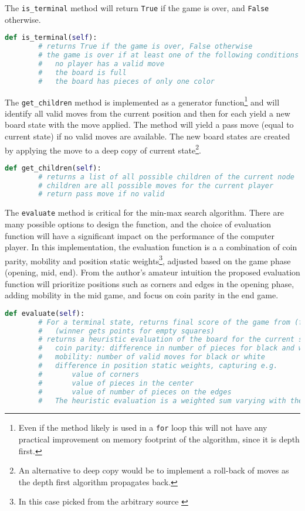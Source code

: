 \documentclass[a4paper]{article}
\begin{document}
The \texttt{is\_terminal} method will return \texttt{True} if the game is over, and \texttt{False} otherwise. 

\begin{lstlisting}[language=Python]
    def is_terminal(self):
        # returns True if the game is over, False otherwise
        # the game is over if at least one of the following conditions holds true:
        #   no player has a valid move
        #   the board is full
        #   the board has pieces of only one color
\end{lstlisting}

The \texttt{get\_children} method is implemented as a generator function\footnote{Even if the method  likely is used in a \texttt{for} loop this will not have any practical improvement on memory footprint of the algorithm, since it is depth first.} and will identify all valid moves from the current position and then for each yield a new board state with the move applied. The method will yield a pass move (equal to current state) if no valid moves are available. The new board states are created by applying the move to a deep copy of current state\footnote{An alternative to deep copy would be to implement a roll-back of moves as the depth first algorithm propagates back.}.

\begin{lstlisting}[language=Python]
    def get_children(self):
        # returns a list of all possible children of the current node
        # children are all possible moves for the current player
        # return pass move if no valid
\end{lstlisting}

The \texttt{evaluate} method is critical for the min-max search algorithm. There are many possible options to design the function, and the choice of evaluation function will have a significant impact on the performance of the computer player. In this implementation, the evaluation function is a a combination of coin parity, mobility and position static weights\footnote{In this case picked from the arbitrary source \cite{heuristics}}, adjusted based on the game phase (opening, mid, end). From the author's amateur intuition the proposed evaluation function will prioritize positions such as corners and edges in the opening phase, adding mobility in the mid game, and focus on coin parity in the end game. 

\begin{lstlisting}[language=Python]
    def evaluate(self):
        # For a terminal state, returns final score of the game from (from Black player perspective):
        #   (winner gets points for empty squares)
        # returns a heuristic evaluation of the board for the current state, as weighted sum of:
        #   coin parity: difference in number of pieces for black and white
        #   mobility: number of valid moves for black or white
        #   difference in position static weights, capturing e.g. 
        #       value of corners 
        #       value of pieces in the center
        #       value of number of pieces on the edges
        #   The heuristic evaluation is a weighted sum varying with the game phase (opening, mid, end)
 \end{lstlisting}
\end{document}
